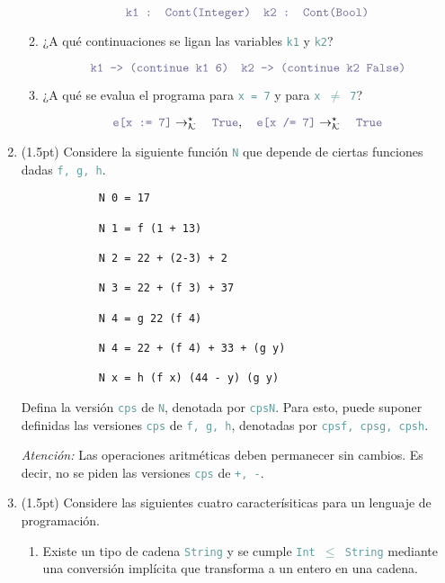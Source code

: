 \documentclass{article}
\newcommand{\tx}[1]{\textcolor{CadetBlue} {\texttt{#1}}}
\newcommand{\ti}[1]{\textcolor{RoyalPurple} {\textit{#1}}}
\newcommand{\pt}[1]{\textcolor{RoyalPurple}{(#1pt)}}
\newcommand{\krs}{\rightarrow_{\mathcal{K}}^{\star} \quad}
\begin{document}
\begin{enumerate}
\begin{enumerate}
            \[
                \tx{k1 : Cont(Integer)} \quad \tx{k2 : Cont(Bool)}
            \]

            \item ¿A qué continuaciones se ligan las variables \tx{k1} y 
            \tx{k2}?

            \[
                \tx{k1 --> (continue k1 6)} \quad \tx{k2 --> (continue k2 False)}
            \]

            \item ¿A qué se evalua el programa para \tx{x = 7} y para 
            \tx{x $\neq$ 7}?

            \[
                \tx{e[x := 7]} \krs \tx{True}, \quad \tx{e[x /= 7]} \krs \tx{True}
            \]
        \end{enumerate}

        \item \pt{1.5} Considere la siguiente función \tx{N} que depende de
        ciertas funciones dadas \tx{f, g, h}.

        \begin{verbatim}
            N 0 = 17

            N 1 = f (1 + 13)

            N 2 = 22 + (2-3) + 2

            N 3 = 22 + (f 3) + 37

            N 4 = g 22 (f 4)

            N 4 = 22 + (f 4) + 33 + (g y)

            N x = h (f x) (44 - y) (g y)
        \end{verbatim}

        Defina la versión \tx{cps} de \tx{N}, denotada por \tx{cpsN}. Para esto,
        puede suponer definidas las versiones \tx{cps} de \tx{f, g, h},
        denotadas por \tx{cpsf, cpsg, cpsh}.

        \ti{Atención:} Las operaciones aritméticas deben permanecer sin cambios.
        Es decir, no se piden las versiones \tx{cps} de \tx{+, -}.

        \item \pt{1.5} Considere las siguientes cuatro caracterísiticas para un 
        lenguaje de programación.

        \begin{enumerate}
            \item Existe un tipo de cadena \tx{String} y se cumple 
            \tx{Int $\leq$ String} mediante una conversión implícita que 
            transforma a un entero en una cadena. 


\end{enumerate}
\end{enumerate}
\end{document}
